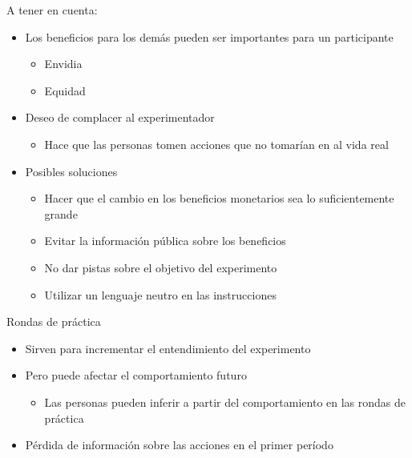 \documentclass[
  ignorenonframetext,
]{beamer}
\providecommand{\tightlist}{%
  \setlength{\itemsep}{0pt}\setlength{\parskip}{0pt}}
\begin{document}
\begin{frame}{A tener en cuenta:}
\protect\hypertarget{a-tener-en-cuenta}{}
\begin{itemize}
\tightlist
\item
  Los beneficios para los demás pueden ser importantes para un
  participante

  \begin{itemize}
  \tightlist
  \item
    Envidia
  \item
    Equidad
  \end{itemize}
\item
  Deseo de complacer al experimentador

  \begin{itemize}
  \tightlist
  \item
    Hace que las personas tomen acciones que no tomarían en al vida real
  \end{itemize}
\item
  Posibles soluciones

  \begin{itemize}
  \tightlist
  \item
    Hacer que el cambio en los beneficios monetarios sea lo
    suficientemente grande
  \item
    Evitar la información pública sobre los beneficios
  \item
    No dar pistas sobre el objetivo del experimento
  \item
    Utilizar un lenguaje neutro en las instrucciones
  \end{itemize}
\end{itemize}
\end{frame}

\begin{frame}{Rondas de práctica}
\protect\hypertarget{rondas-de-pruxe1ctica}{}
\begin{itemize}
\item
  Sirven para incrementar el entendimiento del experimento
\item
  Pero puede afectar el comportamiento futuro

  \begin{itemize}
  \tightlist
  \item
    Las personas pueden inferir a partir del comportamiento en las
    rondas de práctica
  \end{itemize}
\item
  Pérdida de información sobre las acciones en el primer período
\end{itemize}
\end{frame}
\end{document}
